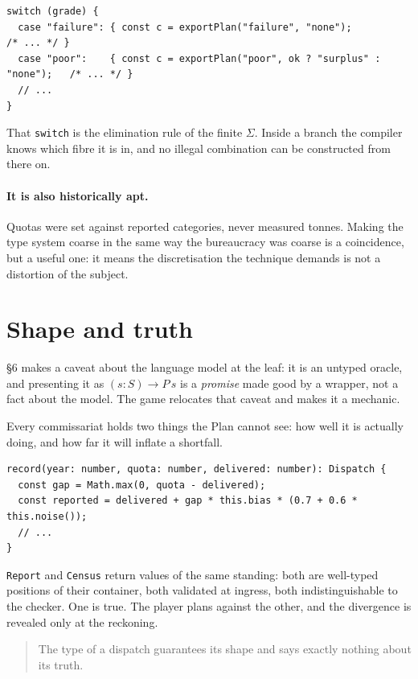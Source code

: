 \documentclass[11pt,a4paper]{article}
\begin{document}
\begin{lstlisting}[language=TS]
switch (grade) {
  case "failure": { const c = exportPlan("failure", "none");                 /* ... */ }
  case "poor":    { const c = exportPlan("poor", ok ? "surplus" : "none");   /* ... */ }
  // ...
}
\end{lstlisting}

\noindent That \verb|switch| is the elimination rule of the finite $\Sigma$.
Inside a branch the compiler knows which fibre it is in, and no illegal
combination can be constructed from there on.

\paragraph{It is also historically apt.} Quotas were set against reported
categories, never measured tonnes. Making the type system coarse in the same
way the bureaucracy was coarse is a coincidence, but a useful one: it means the
discretisation the technique demands is not a distortion of the subject.

\section{Shape and truth}

\S6 makes a caveat about the language model at the leaf: it is an untyped
oracle, and presenting it as $(s : S) \to P\,s$ is a \emph{promise} made good by
a wrapper, not a fact about the model. The game relocates that caveat and makes
it a mechanic.

Every commissariat holds two things the Plan cannot see: how well it is
actually doing, and how far it will inflate a shortfall.

\begin{lstlisting}[language=TS]
record(year: number, quota: number, delivered: number): Dispatch {
  const gap = Math.max(0, quota - delivered);
  const reported = delivered + gap * this.bias * (0.7 + 0.6 * this.noise());
  // ...
}
\end{lstlisting}

\noindent \verb|Report| and \verb|Census| return values of the same standing:
both are well-typed positions of their container, both validated at ingress,
both indistinguishable to the checker. One is true. The player plans against
the other, and the divergence is revealed only at the reckoning.

\begin{quote}
The type of a dispatch guarantees its shape and says exactly nothing about its
truth.
\end{quote}
\end{document}
